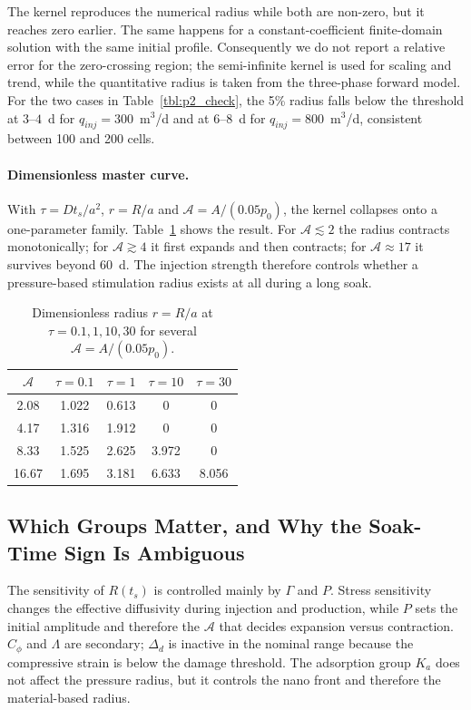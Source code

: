 The kernel reproduces the numerical radius while both are non-zero, but it
reaches zero earlier. The same happens for a constant-coefficient finite-domain
solution with the same initial profile. Consequently we do not report a
relative error for the zero-crossing region; the semi-infinite kernel is used
for scaling and trend, while the quantitative radius is taken from the
three-phase forward model. For the two cases in Table~\ref{tbl:p2_check}, the
5\% radius falls below the threshold at $3$--$4$~d for
$q_{inj}=300$~m$^3$/d and at $6$--$8$~d for $q_{inj}=800$~m$^3$/d, consistent
between 100 and 200 cells.

\paragraph{Dimensionless master curve.}
With $\tau=Dt_s/a^2$, $r=R/a$ and $\mathcal A=A/(0.05p_0)$, the kernel
collapses onto a one-parameter family. Table~\ref{tbl:master} shows the
result. For $\mathcal A\lesssim2$ the radius contracts monotonically; for
$\mathcal A\gtrsim4$ it first expands and then contracts; for
$\mathcal A\approx17$ it survives beyond 60~d. The injection strength
therefore controls whether a pressure-based stimulation radius exists at all
during a long soak.

\begin{table}[h!t]
\centering
\caption{Dimensionless radius $r=R/a$ at $\tau=0.1,1,10,30$ for several
$\mathcal A=A/(0.05p_0)$.}
\label{tbl:master}
\small
\begin{tabular}{ccccc}
\toprule[1.5pt]
$\mathcal A$ & $\tau=0.1$ & $\tau=1$ & $\tau=10$ & $\tau=30$\\
\midrule[1pt]
2.08 & 1.022 & 0.613 & 0 & 0\\
4.17 & 1.316 & 1.912 & 0 & 0\\
8.33 & 1.525 & 2.625 & 3.972 & 0\\
16.67 & 1.695 & 3.181 & 6.633 & 8.056\\
\bottomrule[1.5pt]
\end{tabular}
\end{table}

\subsection{Which Groups Matter, and Why the Soak-Time Sign Is Ambiguous}

The sensitivity of $R(t_s)$ is controlled mainly by $\Gamma$ and $P$.
Stress sensitivity changes the effective diffusivity during injection and
production, while $P$ sets the initial amplitude and therefore the
$\mathcal A$ that decides expansion versus contraction. $C_\phi$ and $\Lambda$
are secondary; $\Delta_d$ is inactive in the nominal range because the
compressive strain is below the damage threshold. The adsorption group $K_a$
does not affect the pressure radius, but it controls the nano front and
therefore the material-based radius.

